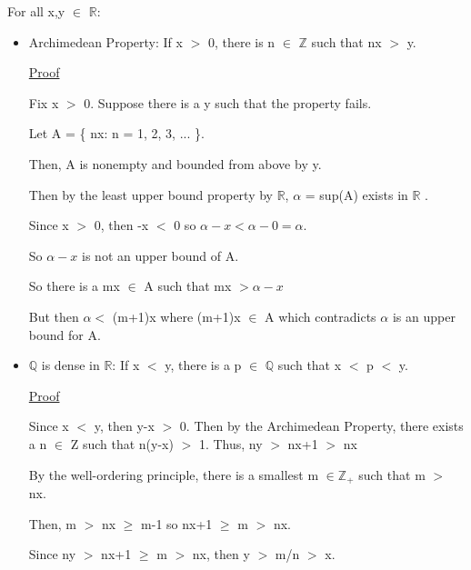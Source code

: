 For all x,y $\in$ $ \mathbb{R} $:
\begin{itemize}[leftmargin=1cm]
	\item {\color{lblue} Archimedean Property}:
		If x $>$ 0, there is n $\in$ $ \mathbb{Z} $ such that nx $>$ y.
	
		{ \color{magenta} \underline{Proof} }

		Fix x $>$ 0. Suppose there is a y such that the property fails.

		Let A = \{ nx: n = 1, 2, 3, ... \}.

		Then, A is nonempty and bounded from above by y.

		Then by the least upper bound property by $ \mathbb{R} $, $\alpha$ = sup(A) exists in $ \mathbb{R} $ .

		Since x $>$ 0, then -x $<$ 0 so $\alpha - x < \alpha-0 = \alpha$.

		So $\alpha-x$ is not an upper bound of A.

		So there is a mx $\in$ A such that mx $> \alpha-x$

		But then $\alpha <$ (m+1)x where (m+1)x $\in$ A which contradicts $\alpha$ is an upper bound for A.

	\item {\color{lblue} $ \mathbb{Q} $  is dense in $ \mathbb{R} $}:
		If x $<$ y, there is a p $\in$ $ \mathbb{Q} $ such that x $<$ p $<$ y.

		{ \color{magenta} \underline{Proof} }

		Since x $<$ y, then y-x $>$ 0. Then by the Archimedean Property, there exists a n $\in$ Z
		such that n(y-x) $>$ 1. Thus, ny $>$ nx+1 $>$ nx

		By the well-ordering principle, there is a smallest m $\in \mathbb{Z_+} $ such that m $>$ nx.

		Then, m $>$ nx $\geq$ m-1 so nx+1 $\geq$ m $>$ nx.

		Since ny $>$ nx+1 $\geq$ m $>$ nx, then y $>$ m/n $>$ x.

\end{itemize}
